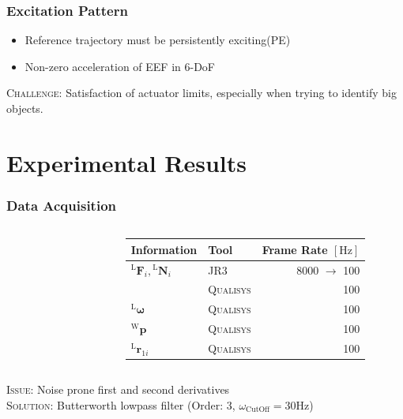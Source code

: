 \documentclass[student,noshadow]{ITRslides}
\renewcommand{\vec}[1]{\boldsymbol{#1}}
\renewcommand{\vec}[1]{\boldsymbol{#1}}
\newcommand{\scr}[1]{\mathrm{#1}}
\begin{document}
\begin{frame}
	\frametitle{Excitation Pattern}
	\vspace{1cm}	
	\begin{itemize}
		\item Reference trajectory must be persistently exciting(PE)
		\item Non-zero acceleration of EEF in 6-DoF \cite{literaturstelle3}
	\end{itemize}
	\vspace{1cm}
	\textsc{Challenge}: Satisfaction of actuator limits, especially when trying to identify big objects.
\end{frame}

\section{Experimental Results}
\begin{frame}
	\frametitle{Data Acquisition}
	\begin{columns}
		\begin{column}{0.35\textwidth}
			\begin{figure}
				\centering
				
			\end{figure}	
		\end{column}
		\begin{column}{0.65\textwidth}
			\begin{tabular}{llr}
				\toprule
				Information                                   & Tool              & Frame Rate $\left[\mathrm{Hz}\right]$ \\
				\midrule
				${^\scr{L}}\vec{F}_{i},{^\scr{L}}\vec{N}_{i}$ & \textsc{JR3}      & 8000 $\rightarrow$ 100                \\
				                                              & \textsc{Qualisys} & 100                                   \\
				$^\scr{L}\vec{\omega}$                        & \textsc{Qualisys} & 100                                   \\
				$^\scr{W}\vec{p}$                             & \textsc{Qualisys} & 100                                   \\
				$^\scr{L}\vec{r}_{1i}$                        & \textsc{Qualisys} & 100                                   \\
				\bottomrule
			\end{tabular}
		\end{column}
	\end{columns}
	\textsc{Issue}: Noise prone first and second derivatives\\
	\textsc{Solution}: Butterworth lowpass filter (Order: 3, $\omega_\mathrm{CutOff} = 30 \mathrm{Hz}$)
\end{frame}
\end{document}
